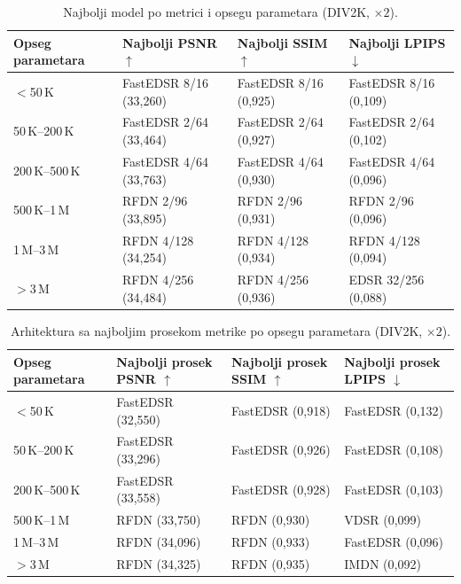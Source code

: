 
\begin{table}[H]
    \centering
    \caption{Najbolji model po metrici i opsegu parametara (DIV2K, $\times2$).}
    \label{tab:param_bins_best_model_2x_DIV2K}
    \small
    \setlength{\tabcolsep}{4pt}
    \begin{tabular}{@{}llll@{}}
        \toprule
        Opseg parametara & Najbolji PSNR $\uparrow$ & Najbolji SSIM $\uparrow$ & Najbolji LPIPS $\downarrow$ \\
        \midrule
        $<$50\,K & FastEDSR 8/16 (33,260) & FastEDSR 8/16 (0,925) & FastEDSR 8/16 (0,109) \\
        50\,K--200\,K & FastEDSR 2/64 (33,464) & FastEDSR 2/64 (0,927) & FastEDSR 2/64 (0,102) \\
        200\,K--500\,K & FastEDSR 4/64 (33,763) & FastEDSR 4/64 (0,930) & FastEDSR 4/64 (0,096) \\
        500\,K--1\,M & RFDN 2/96 (33,895) & RFDN 2/96 (0,931) & RFDN 2/96 (0,096) \\
        1\,M--3\,M & RFDN 4/128 (34,254) & RFDN 4/128 (0,934) & RFDN 4/128 (0,094) \\
        $>$3\,M & RFDN 4/256 (34,484) & RFDN 4/256 (0,936) & EDSR 32/256 (0,088) \\
        \bottomrule
    \end{tabular}
\end{table}

\begin{table}[H]
    \centering
    \caption{Arhitektura sa najboljim prosekom metrike po opsegu parametara (DIV2K, $\times2$).}
    \label{tab:param_bins_best_arch_2x_DIV2K}
    \small
    \setlength{\tabcolsep}{4pt}
    \begin{tabular}{@{}llll@{}}
        \toprule
        Opseg parametara & Najbolji prosek PSNR $\uparrow$ & Najbolji prosek SSIM $\uparrow$ & Najbolji prosek LPIPS $\downarrow$ \\
        \midrule
        $<$50\,K & FastEDSR (32,550) & FastEDSR (0,918) & FastEDSR (0,132) \\
        50\,K--200\,K & FastEDSR (33,296) & FastEDSR (0,926) & FastEDSR (0,108) \\
        200\,K--500\,K & FastEDSR (33,558) & FastEDSR (0,928) & FastEDSR (0,103) \\
        500\,K--1\,M & RFDN (33,750) & RFDN (0,930) & VDSR (0,099) \\
        1\,M--3\,M & RFDN (34,096) & RFDN (0,933) & FastEDSR (0,096) \\
        $>$3\,M & RFDN (34,325) & RFDN (0,935) & IMDN (0,092) \\
        \bottomrule
    \end{tabular}
\end{table}

